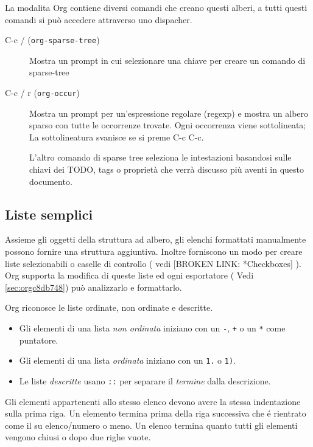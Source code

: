 \documentclass[11pt]{article}
\begin{document}
La modalita Org contiene diversi comandi che creano questi alberi, a tutti
questi comandi si può accedere attraverso uno dispacher.

\begin{description}
\item[{C-c / (\texttt{org-sparse-tree})}] Mostra un prompt in cui selezionare una chiave per creare un comando di
sparse-tree

\item[{C-c / r (\texttt{org-occur})}] Mostra un prompt per un'espressione regolare (regexp) e mostra un albero
sparso con tutte le occorrenze trovate. Ogni occorrenza viene
sottolineata; La sottolineatura svanisce se si preme C-c C-c.

L'altro comando di sparse tree seleziona le intestazioni basandosi sulle
chiavi dei TODO, tags o proprietà che verrà discusso più aventi in questo
documento.
\end{description}

\subsection{Liste semplici}
\label{sec:orgd18e700}
Assieme gli oggetti della struttura ad albero, gli elenchi formattati
manualmente possono fornire una struttura aggiuntiva. Inoltre
forniscono un modo per creare liste selezionabili o caselle di
controllo ( vedi [BROKEN LINK: *Checkboxes] ). Org supporta la modifica di queste
liste ed ogni esportatore ( Vedi \ref{sec:orgc8db748}) può analizzarlo e
formattarlo.

Org riconosce le liste ordinate, non ordinate e descritte.

\begin{itemize}
\item Gli elementi di una lista \emph{non ordinata} iniziano con un \texttt{-}, \texttt{+} o
un \texttt{*} come puntatore.
\item Gli elementi di una lista \emph{ordinata} iniziano con un \texttt{1.} o \texttt{1)}.
\item Le liste \emph{descritte} usano \texttt{::} per separare il \emph{termine} dalla
descrizione.
\end{itemize}

Gli elementi appartenenti allo stesso elenco devono avere la stessa
indentazione sulla prima riga. Un elemento termina prima della riga
successiva che é rientrato come il su elenco/numero o meno. Un elenco
termina quanto tutti gli elementi vengono chiusi o dopo due righe
vuote.
\end{document}
